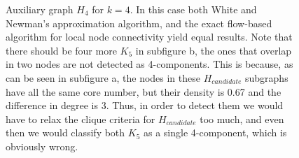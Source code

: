 \begin{figure}[H]
\centering
{}
\hspace{.05in}

\caption[Auxiliary graph $H_4$ for $k=4$.]{Auxiliary graph $H_4$ for $k=4$. In this case both White and Newman's approximation algorithm, and the exact flow-based algorithm for local node connectivity yield equal results. Note that there should be four more $K_5$ in subfigure b, the ones that overlap in two nodes are not detected as 4-components. This is because, as can be seen in subfigure a, the nodes in these $H_{candidate}$ subgraphs have all the same core number, but their density is 0.67 and the difference in degree is 3. Thus, in order to detect them we would have to relax the clique criteria for $H_{candidate}$ too much, and even then we would classify both $K_5$ as a single 4-component, which is obviously wrong.}
\label{fig:example_4}
\end{figure}

